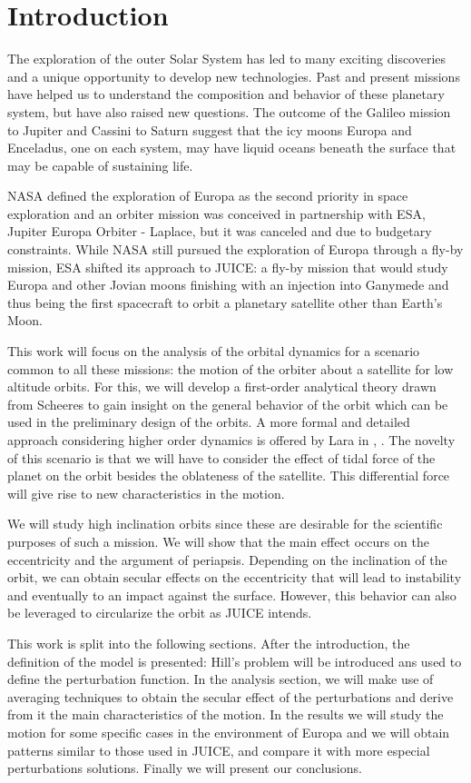\section{Introduction}
The exploration of the outer Solar System has led to many exciting discoveries and a unique opportunity to develop new technologies. Past and present missions have helped us to understand the composition and behavior of these planetary system, but have also raised new questions. The outcome of the Galileo mission to Jupiter and Cassini to Saturn suggest that the icy moons Europa and Enceladus, one on each system, may have liquid oceans beneath the surface that may be capable of sustaining life.

NASA defined the exploration of Europa as the second priority in space exploration \cite{nasa2011vision} and an orbiter mission was conceived in partnership with ESA, Jupiter Europa Orbiter - Laplace, but it was canceled and due to budgetary constraints. While NASA still pursued the exploration of Europa through a fly-by mission, ESA shifted its approach to JUICE: a fly-by mission that would study Europa and other Jovian moons finishing with an injection into Ganymede \cite{esa2014juice} and thus being the first spacecraft to orbit a planetary satellite other than Earth's Moon.

This work will focus on the analysis of the orbital dynamics for a scenario common to all these missions: the motion of the orbiter about a satellite for low altitude orbits. For this, we will develop a first-order analytical theory drawn from Scheeres \cite{scheeres2012orbital} \cite{scheeres2001stability} to gain insight on the general behavior of the orbit which can be used in the preliminary design of the orbits. A more formal and detailed approach considering higher order dynamics is offered by Lara in \cite{lara2005secular}, \cite{lara2010mission}. The novelty of this scenario is that we will have to consider the effect of tidal force of the planet on the orbit besides the oblateness of the satellite. This differential force will give rise to new characteristics in the motion.

We will study high inclination orbits since these are desirable for the scientific purposes of such a mission. We will show that the main effect occurs on the eccentricity and the argument of periapsis. Depending on the inclination of the orbit, we can obtain secular effects on the eccentricity that will lead to instability and eventually to an impact against the surface. However, this behavior can also be leveraged to circularize the orbit as JUICE intends.

This work is split into the following sections. After the introduction, the definition of the model is presented: Hill's problem will be introduced ans used to define the perturbation function. In the analysis section, we will make use of averaging techniques to obtain the secular effect of the perturbations and derive from it the main characteristics of the motion. In the results we will study the motion for some specific cases in the environment of Europa and we will obtain patterns similar to those used in JUICE, and compare it with more especial perturbations solutions. Finally we will present our conclusions.

